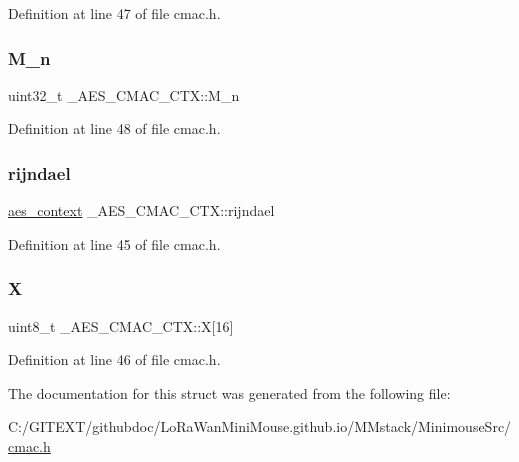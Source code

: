 Definition at line 47 of file cmac.\+h.

\mbox{\label{struct___a_e_s___c_m_a_c___c_t_x_a2c48607df1e9c1847d3e4ff11612124b}} 
\subsubsection{\texorpdfstring{M\+\_\+n}{M\_n}}
{\footnotesize\ttfamily uint32\+\_\+t \+\_\+\+A\+E\+S\+\_\+\+C\+M\+A\+C\+\_\+\+C\+T\+X\+::\+M\+\_\+n}



Definition at line 48 of file cmac.\+h.

\mbox{\label{struct___a_e_s___c_m_a_c___c_t_x_a111583eab419917697a4ed96963f293c}} 
\subsubsection{\texorpdfstring{rijndael}{rijndael}}
{\footnotesize\ttfamily \mbox{\hyperlink{structaes__context}{aes\+\_\+context}} \+\_\+\+A\+E\+S\+\_\+\+C\+M\+A\+C\+\_\+\+C\+T\+X\+::rijndael}



Definition at line 45 of file cmac.\+h.

\mbox{\label{struct___a_e_s___c_m_a_c___c_t_x_a3be115a420dc4da7db29666a2ca6d850}} 
\subsubsection{\texorpdfstring{X}{X}}
{\footnotesize\ttfamily uint8\+\_\+t \+\_\+\+A\+E\+S\+\_\+\+C\+M\+A\+C\+\_\+\+C\+T\+X\+::X\mbox{[}16\mbox{]}}



Definition at line 46 of file cmac.\+h.



The documentation for this struct was generated from the following file\+:\begin{DoxyCompactItemize}
\item 
C\+:/\+G\+I\+T\+E\+X\+T/githubdoc/\+Lo\+Ra\+Wan\+Mini\+Mouse.\+github.\+io/\+M\+Mstack/\+Minimouse\+Src/\mbox{\hyperlink{cmac_8h}{cmac.\+h}}\end{DoxyCompactItemize}
